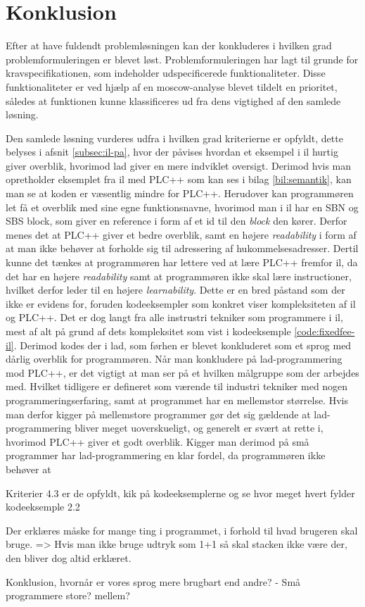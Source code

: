\chapter{Konklusion}
\label{sec:konklusion}

Efter at have fuldendt problemløsningen kan der konkluderes i hvilken grad problemformuleringen er blevet løst.
Problemformuleringen har lagt til grunde for kravspecifikationen, som indeholder udspecificerede funktionaliteter.
Disse funktionaliteter er ved hjælp af en \gls{moscow}-analyse blevet tildelt en prioritet, således at funktionen kunne klassificeres ud fra dens vigtighed af den samlede løsning.

Den samlede løsning vurderes udfra i hvilken grad kriterierne er opfyldt, dette belyses i afsnit \ref{subsec:il-pa}, hvor der påvises hvordan et eksempel i \gls{il} hurtig giver overblik, hvorimod \gls{lad} giver en mere indviklet oversigt. Derimod hvis man opretholder eksemplet fra \gls{il} med PLC++ som kan ses i bilag \ref{bil:semantik}, kan man se at koden er væsentlig mindre for PLC++.
Herudover kan programmøren let få et overblik med sine egne funktionsnavne, hvorimod man i \gls{il} har en SBN og SBS block, som giver en reference i form af et id til den \textit{block} den kører.
Derfor menes det at PLC++ giver et bedre overblik, samt en højere \textit{readability} i form af at man ikke behøver at forholde sig til adressering af hukommelsesadresser.
Dertil kunne det tænkes at programmøren har lettere ved at lære PLC++ fremfor \gls{il}, da det har en højere  \textit{readability} samt at programmøren ikke skal lære instructioner, hvilket derfor leder til en højere \textit{learnability}. Dette er en bred påstand som der ikke er evidens for, foruden kodeeksempler som konkret viser kompleksiteten af \gls{il} og PLC++.
Det er dog langt fra alle instrustri tekniker som programmere i \gls{il}, mest af alt på grund af dets kompleksitet som vist i kodeeksemple \ref{code:fixedfee-il}.
Derimod kodes der i \gls{lad}, som førhen er blevet konkluderet som et sprog med dårlig overblik for programmøren.
Når man konkludere på \gls{lad}-programmering mod PLC++, er det vigtigt at man ser på et hvilken målgruppe som der arbejdes med.
Hvilket tidligere er defineret som værende til industri tekniker med nogen programmeringserfaring, samt at programmet har en mellemstor størrelse.
Hvis man derfor kigger på mellemstore programmer gør det sig gældende at \gls{lad}-programmering bliver meget uoverskueligt, og generelt er svært at rette i, hvorimod PLC++ giver et godt overblik.
Kigger man derimod på små programmer har \gls{lad}-programmering en klar fordel, da programmøren ikke behøver at 






Kriterier 4.3 er de opfyldt, kik på kodeeksemplerne og se hvor meget hvert fylder kodeeksemple 2.2

Der erklæres måske for mange ting i programmet, i forhold til hvad brugeren skal bruge. => Hvis man ikke bruge udtryk som 1+1 så skal stacken ikke være der, den bliver dog altid erklæret.

Konklusion, hvornår er vores sprog mere brugbart end andre? - Små programmere store? mellem?

